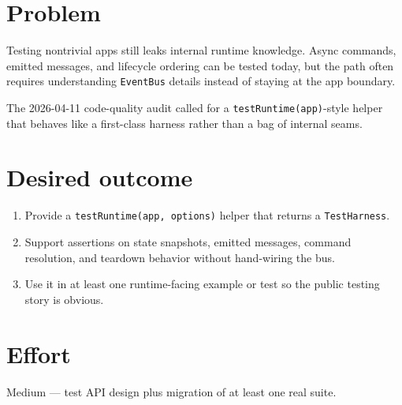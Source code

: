 \section{Problem}\label{record-328-problem}

Testing nontrivial apps still leaks internal runtime knowledge. Async commands, emitted messages, and lifecycle ordering can be tested today, but the path often requires understanding \texttt{E\allowbreak{}v\allowbreak{}e\allowbreak{}n\allowbreak{}t\allowbreak{}B\allowbreak{}u\allowbreak{}s} details instead of staying at the app boundary.

The 2026-04-11 code-quality audit called for a \texttt{t\allowbreak{}e\allowbreak{}s\allowbreak{}t\allowbreak{}R\allowbreak{}u\allowbreak{}n\allowbreak{}t\allowbreak{}i\allowbreak{}m\allowbreak{}e\allowbreak{}(\allowbreak{}a\allowbreak{}p\allowbreak{}p\allowbreak{})}-style helper that behaves like a first-class harness rather than a bag of internal seams.

\section{Desired outcome}\label{record-328-desired-outcome}

\begin{enumerate}
\def\labelenumi{\arabic{enumi}.}
\tightlist
\item
  Provide a \texttt{t\allowbreak{}e\allowbreak{}s\allowbreak{}t\allowbreak{}R\allowbreak{}u\allowbreak{}n\allowbreak{}t\allowbreak{}i\allowbreak{}m\allowbreak{}e\allowbreak{}(\allowbreak{}a\allowbreak{}p\allowbreak{}p\allowbreak{},\allowbreak{} \allowbreak{}o\allowbreak{}p\allowbreak{}t\allowbreak{}i\allowbreak{}o\allowbreak{}n\allowbreak{}s\allowbreak{})} helper that returns a \texttt{T\allowbreak{}e\allowbreak{}s\allowbreak{}t\allowbreak{}H\allowbreak{}a\allowbreak{}r\allowbreak{}n\allowbreak{}e\allowbreak{}s\allowbreak{}s}.
\item
  Support assertions on state snapshots, emitted messages, command resolution, and teardown behavior without hand-wiring the bus.
\item
  Use it in at least one runtime-facing example or test so the public testing story is obvious.
\end{enumerate}

\section{Effort}\label{record-328-effort}

Medium --- test API design plus migration of at least one real suite.

